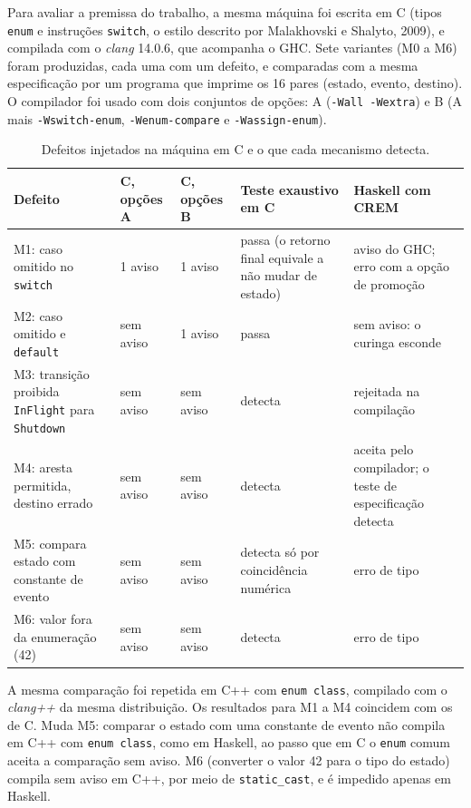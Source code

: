 \documentclass[12pt,a4paper]{article}
\begin{document}
Para avaliar a premissa do trabalho, a mesma máquina foi escrita em C (tipos \texttt{enum} e instruções \texttt{switch}, o estilo descrito por Malakhovski e Shalyto, 2009), e compilada com o \textit{clang} 14.0.6, que acompanha o GHC. Sete variantes (M0 a M6) foram produzidas, cada uma com um defeito, e comparadas com a mesma especificação por um programa que imprime os 16 pares (estado, evento, destino). O compilador foi usado com dois conjuntos de opções: A (\texttt{-Wall -Wextra}) e B (A mais \texttt{-Wswitch-enum}, \texttt{-Wenum-compare} e \texttt{-Wassign-enum}).

\begin{table}[h]
\centering
\scriptsize
\begin{tabular}{|p{3.4cm}|p{1.6cm}|p{1.6cm}|p{2.2cm}|p{4.3cm}|}
\hline
Defeito & C, opções A & C, opções B & Teste exaustivo em C & Haskell com CREM \\
\hline
M1: caso omitido no \texttt{switch} & 1 aviso & 1 aviso & passa (o retorno final equivale a não mudar de estado) & aviso do GHC; erro com a opção de promoção \\
\hline
M2: caso omitido e \texttt{default} & sem aviso & 1 aviso & passa & sem aviso: o curinga esconde \\
\hline
M3: transição proibida \texttt{InFlight} para \texttt{Shutdown} & sem aviso & sem aviso & detecta & rejeitada na compilação \\
\hline
M4: aresta permitida, destino errado & sem aviso & sem aviso & detecta & aceita pelo compilador; o teste de especificação detecta \\
\hline
M5: compara estado com constante de evento & sem aviso & sem aviso & detecta só por coincidência numérica & erro de tipo \\
\hline
M6: valor fora da enumeração (42) & sem aviso & sem aviso & detecta & erro de tipo \\
\hline
\end{tabular}
\caption{Defeitos injetados na máquina em C e o que cada mecanismo detecta.}
\end{table}

A mesma comparação foi repetida em C++ com \texttt{enum class}, compilado com o \textit{clang++} da mesma distribuição. Os resultados para M1 a M4 coincidem com os de C. Muda M5: comparar o estado com uma constante de evento não compila em C++ com \texttt{enum class}, como em Haskell, ao passo que em C o \texttt{enum} comum aceita a comparação sem aviso. M6 (converter o valor 42 para o tipo do estado) compila sem aviso em C++, por meio de \texttt{static\_cast}, e é impedido apenas em Haskell.
\end{document}
